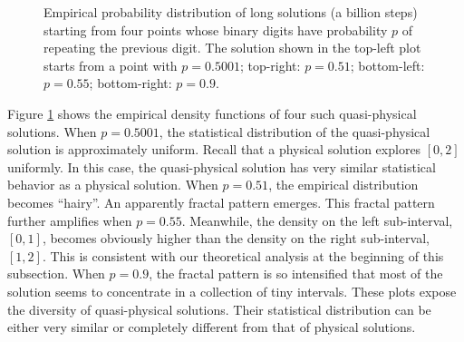 \begin{figure}
\caption{Empirical probability distribution of long solutions (a billion steps)
starting from four points whose binary digits have probability $p$ of
repeating the previous digit.
The solution shown in the top-left plot starts from a point with $p=0.5001$;
top-right: $p=0.51$; bottom-left: $p=0.55$; bottom-right: $p=0.9$.
}
\label{fig:tent_quasiphysical}
\end{figure}

Figure \ref{fig:tent_quasiphysical} shows the empirical density functions of
four such quasi-physical solutions.  When $p=0.5001$,
the statistical distribution of the quasi-physical solution
is approximately uniform.  Recall that a physical solution explores $[0,2]$
uniformly.  In this case, the quasi-physical solution has very similar
statistical behavior as a physical solution.  When $p=0.51$, the empirical
distribution becomes ``hairy''.  An apparently fractal pattern emerges.
This fractal pattern further amplifies when $p=0.55$.  Meanwhile,
the density on the left sub-interval, $[0,1]$, becomes obviously higher than
the density on the right sub-interval, $[1,2]$.  This is consistent with our
theoretical analysis at the beginning of this subsection.
When $p=0.9$, the fractal pattern is so intensified that most
of the solution seems to concentrate in a collection of tiny intervals.
These plots expose the diversity of quasi-physical solutions.
Their statistical distribution can be either
very similar or completely different from that of physical solutions.

